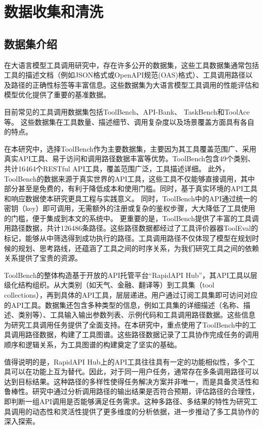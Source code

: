 \section{数据收集和清洗}

\subsection{数据集介绍}

在大语言模型工具调用研究中，存在许多公开的数据集，这些工具数据集通常包括工具的描述文档（例如JSON格式\cite{Qin2023}或OpenAPI规范(OAS)\cite{Song2023}格式）、工具调用路径\cite{Qin2023, liu2024toolace}以及路径的正确性标签等丰富信息。这些数据集为大语言模型工具调用的性能评估和模型优化提供了重要的基准数据。

\sloppy
目前常见的工具调用数据集包括ToolBench\cite{Qin2023}、API-Bank\cite{Li2023c}、
TaskBench\cite{shen2023taskbench}和ToolAce\cite{liu2024toolace}等。
这些数据集在工具数量、描述细节、调用复杂度以及场景覆盖方面具有各自的特点。
\relax

在本研究中，选择ToolBench作为主要数据集，主要因为其工具覆盖范围广、采用真实API工具、易于访问和调用路径数据丰富等优势。ToolBench包含49个类别、共计16464个RESTful API工具，覆盖范围广泛，工具描述详细。
此外，ToolBench的数据来源于真实世界的API工具，这些工具不仅能够直接调用，其中部分甚至是免费的，有利于降低成本和使用门槛。同时，基于真实环境的API工具和响应数据使本研究更具工程与实践意义。
同时，ToolBench中的API通过统一的密钥（key）即可调用，无需额外的注册或复杂的鉴权步骤，大大降低了工具使用的门槛，便于集成到本文的系统中。
更重要的是，ToolBench提供了丰富的工具调用路径数据，共计126486条路径。这些路径数据都经过了工具评价器器ToolEval\cite{Qin2023}的标记，能够从中筛选得到成功执行的路径。工具调用路径不仅体现了模型在规划时候的规划、思考路线，还蕴涵了工具之间的时序关系，为我们研究工具之间的依赖关系提供了宝贵的资源。

ToolBench的整体构造基于开放的API托管平台“RapidAPI Hub”，其API工具以层级化结构组织。从大类别（如天气、金融、翻译等）到工具集（tool collections），再到具体的API工具，层层递进。用户通过订阅工具集即可访问对应的API工具。数据集还包含多种类型的信息，例如工具集的详细描述（名称、描述、类别等）、工具输入输出参数列表、示例代码和工具调用路径数据。这些信息为研究工具调用任务提供了全面支持。在本研究中，重点使用了ToolBench中的工具调用路径数据，构建了工具图谱。这些路径数据记录了工具协作完成任务的调用顺序和逻辑关系，为工具图谱的构建奠定了坚实的基础。

值得说明的是，RapidAPI Hub上的API工具往往具有一定的功能相似性，多个工具可以在功能上互为替代。因此，对于同一用户任务，通常存在多条调用路径可以达到目标结果。这种路径的多样性使得任务解决方案并非唯一，而是具备灵活性和鲁棒性。研究中通过分析调用路径的输出结果是否符合预期，评估路径的合理性，即判断一组API调用是否能够满足任务需求。这种多路径、多结果的特性为研究工具调用的动态性和灵活性提供了更多维度的分析依据，进一步推动了多工具协作的深入探索。

